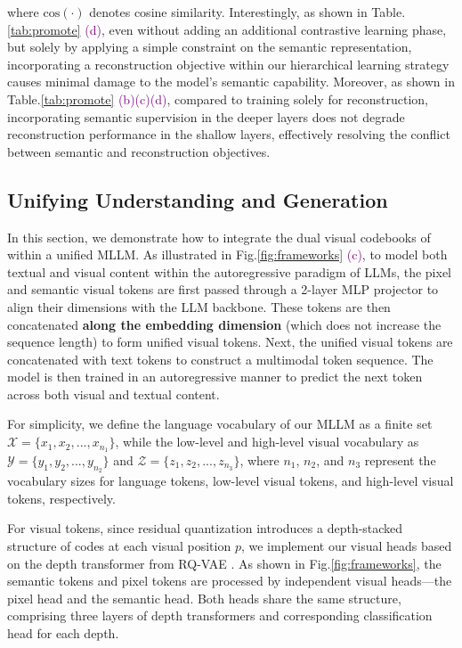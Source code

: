 where $\mathrm{cos}(\cdot)$ denotes cosine similarity. Interestingly, as shown in Table.\ref{tab:promote} \textcolor{purple}{(d)}, even without adding an additional contrastive learning phase, but solely by applying a simple constraint on the semantic representation, incorporating a reconstruction objective within our hierarchical learning strategy causes minimal damage to the model's semantic capability.
Moreover, as shown in Table.\ref{tab:promote} \textcolor{purple}{(b)(c)(d)}, compared to training solely for reconstruction, incorporating semantic supervision in the deeper layers does not degrade reconstruction performance in the shallow layers, effectively resolving the conflict between semantic and reconstruction objectives.


\subsection{Unifying Understanding and Generation}
\label{sec:method_mllm}



In this section, we demonstrate how to integrate the dual visual codebooks of \ours{} within a unified MLLM.
As illustrated in Fig.\ref{fig:frameworks} \textcolor{purple}{(c)}, to model both textual and visual content within the autoregressive paradigm of LLMs, the pixel and semantic visual tokens are first passed through a 2-layer MLP projector to align their dimensions with the LLM backbone. These tokens are then concatenated \textbf{along the embedding dimension} (which does not increase the sequence length) to form unified visual tokens. Next, the unified visual tokens are concatenated with text tokens to construct a multimodal token sequence. The model is then trained in an autoregressive manner to predict the next token across both visual and textual content.

For simplicity, we define the language vocabulary of our MLLM as a finite set $\mathcal{X}=\{x_1, x_2, ..., x_{n_1}\}$, while the low-level and high-level visual vocabulary as $\mathcal{Y}=\{y_1, y_2, ..., y_{n_2}\}$ and $\mathcal{Z}=\{z_1, z_2, ..., z_{n_3}\}$, where $n_1$, $n_2$, and $n_3$ represent the vocabulary sizes for language tokens, low-level visual tokens, and high-level visual tokens, respectively.

For visual tokens, since residual quantization introduces a depth-stacked structure of codes at each visual position $p$, we implement our visual heads based on the depth transformer from RQ-VAE \citep{lee2022rqvae}. 
As shown in Fig.\ref{fig:frameworks}, the semantic tokens and pixel tokens are processed by independent visual heads---the pixel head and the semantic head. Both heads share the same structure, comprising three layers of depth transformers and corresponding classification head for each depth.

